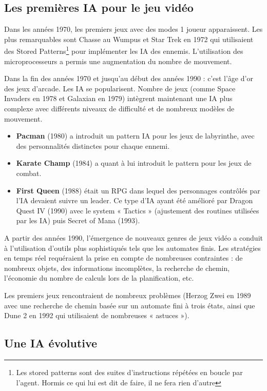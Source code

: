 \documentclass[a4paper, 12pt]{article} %
\begin{document}
\newpage
\subsection{Les premières IA pour le jeu vidéo}
Dans les années 1970, les premiers jeux avec des modes 1 joueur apparaissent. Les plus remarquables sont Chasse au Wumpus et Star Trek en 1972 qui utilisaient des Stored Patterns\footnote{Les stored patterns sont des suites d’instructions répétées en boucle par l’agent. Hormis ce qui lui est dit de faire, il ne fera rien d’autre}  pour implémenter les IA des ennemis. L’utilisation des microprocesseurs a permis une augmentation du nombre de mouvement. 

Dans la fin des années 1970 et jusqu’au début des années 1990 : c’est l’âge d’or des jeux d’arcade. Les IA se popularisent. Nombre de jeux (comme Space Invaders en 1978 et Galaxian en 1979) intègrent maintenant une IA plus complexe avec différents niveaux de difficulté et de nombreux modèles de mouvement. 

\begin{itemize}
	\item \textbf{Pacman} (1980) a introduit un pattern IA pour les jeux de labyrinthe, avec des personnalités distinctes pour chaque ennemi.
	\item \textbf{Karate Champ} (1984) a quant à lui introduit le pattern pour les jeux de combat.
	\item \textbf{First Queen} (1988) était un RPG dans lequel des personnages contrôlés par l’IA devaient suivre un leader. Ce type d’IA ayant été amélioré par Dragon Quest IV (1990) avec le system « Tactics » (ajustement des routines utilisées par les IA) puis Secret of Mana (1993).
\end{itemize}

A partir des années 1990, l’émergence de nouveaux genres de jeux vidéo a conduit à l’utilisation d’outils plus sophistiqués tels que les automates finis. Les stratégies en temps réel requéraient la prise en compte de nombreuses contraintes : de nombreux objets, des informations incomplètes, la recherche de chemin, l’économie du nombre de calculs lors de la planification, etc. 

Les premiers jeux rencontraient de nombreux problèmes (Herzog Zwei en 1989 avec une recherche de chemin basée sur un automate fini à trois états, ainsi que Dune 2 en 1992 qui utilisaient de nombreuses « astuces »). 

\newpage
\subsection{Une IA évolutive}
\end{document}
